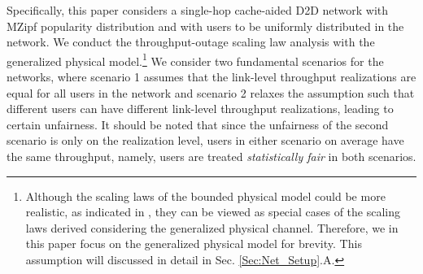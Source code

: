 \documentclass[journal,draftclsnofoot,onecolumn,12pt,twoside]{IEEEtran}
\begin{document}
Specifically, this paper considers a single-hop cache-aided D2D network with MZipf popularity distribution and with users to be uniformly distributed in the network. We conduct the throughput-outage scaling law analysis with the generalized physical model.\footnote{Although the scaling laws of the bounded physical model could be more realistic, as indicated in \cite{agarwal2004capacity}, they can be viewed as special cases of the scaling laws derived considering the generalized physical channel. Therefore, we in this paper focus on the generalized physical model for brevity. This assumption will discussed in detail in Sec. \ref{Sec:Net_Setup}.A.} %
We consider two fundamental scenarios for the networks, where scenario 1 assumes that the link-level throughput realizations are equal for all users in the network and scenario 2 relaxes the assumption such that different users can have different link-level throughput realizations, leading to certain unfairness. It should be noted that since the unfairness of the second scenario is only on the realization level, users in either scenario on average have the same throughput, namely, users are treated {\em statistically fair} in both scenarios. 
\end{document}
